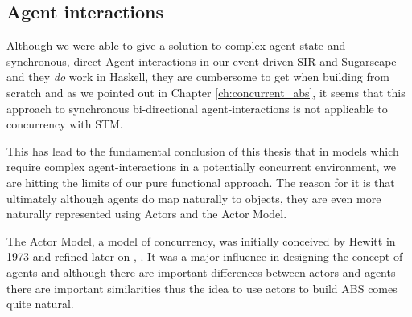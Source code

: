 \subsection{Agent interactions}
Although we were able to give a solution to complex agent state and synchronous, direct Agent-interactions in our event-driven SIR and Sugarscape and they \textit{do} work in Haskell, they are cumbersome to get when building from scratch and as we pointed out in Chapter \ref{ch:concurrent_abs}, it seems that this approach to synchronous bi-directional agent-interactions is not applicable to concurrency with STM. 

This has lead to the fundamental conclusion of this thesis that in models which require complex agent-interactions in a potentially concurrent environment, we are hitting the limits of our pure functional approach. The reason for it is that ultimately although agents do map naturally to objects, they are even more naturally represented using Actors and the Actor Model.

The Actor Model, a model of concurrency, was initially conceived by Hewitt in 1973 \cite{hewitt_universal_1973} and refined later on \cite{hewitt_what_2007}, \cite{hewitt_actor_2010}. It was a major influence in designing the concept of agents and although there are important differences between actors and agents there are important similarities thus the idea to use actors to build ABS comes quite natural. %

